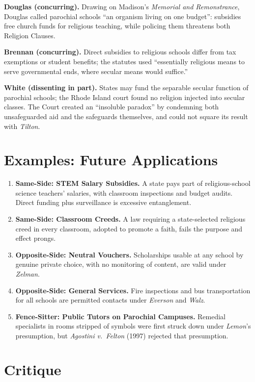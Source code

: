 \documentclass[12pt]{article}
\begin{document}
\textbf{Douglas (concurring).} Drawing on Madison's \textit{Memorial and Remonstrance}, Douglas called parochial schools ``an organism living on one budget'': subsidies free church funds for religious teaching, while policing them threatens both Religion Clauses.

\textbf{Brennan (concurring).} Direct subsidies to religious schools differ from tax exemptions or student benefits; the statutes used ``essentially religious means to serve governmental ends, where secular means would suffice.''

\textbf{White (dissenting in part).} States may fund the separable secular function of parochial schools; the Rhode Island court found no religion injected into secular classes. The Court created an ``insoluble paradox'' by condemning both unsafeguarded aid and the safeguards themselves, and could not square its result with \textit{Tilton}.

\section{Examples: Future Applications}

\begin{enumerate}
\item \textbf{Same-Side: STEM Salary Subsidies.} A state pays part of religious-school science teachers' salaries, with classroom inspections and budget audits. Direct funding plus surveillance is excessive entanglement.
\item \textbf{Same-Side: Classroom Creeds.} A law requiring a state-selected religious creed in every classroom, adopted to promote a faith, fails the purpose and effect prongs.
\item \textbf{Opposite-Side: Neutral Vouchers.} Scholarships usable at any school by genuine private choice, with no monitoring of content, are valid under \textit{Zelman}.
\item \textbf{Opposite-Side: General Services.} Fire inspections and bus transportation for all schools are permitted contacts under \textit{Everson} and \textit{Walz}.
\item \textbf{Fence-Sitter: Public Tutors on Parochial Campuses.} Remedial specialists in rooms stripped of symbols were first struck down under \textit{Lemon}'s presumption, but \textit{Agostini v.\ Felton} (1997) rejected that presumption.
\end{enumerate}

\section{Critique}
\end{document}
